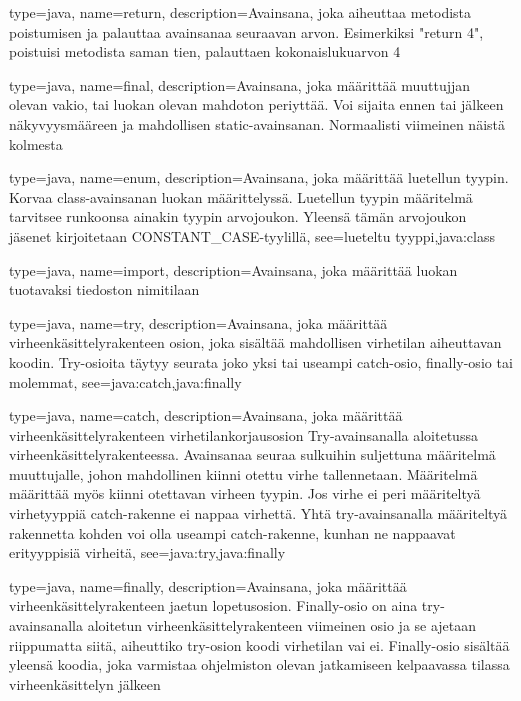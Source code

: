 {
	type=java,
	name=return,
	description={Avainsana, joka aiheuttaa metodista poistumisen ja palauttaa avainsanaa seuraavan
arvon. Esimerkiksi "return 4", poistuisi metodista saman tien, palauttaen kokonaislukuarvon 4}
}

{
	type=java,
	name=final,
	description={Avainsana, joka määrittää muuttujjan olevan vakio, tai luokan olevan mahdoton
periyttää. Voi sijaita ennen tai jälkeen näkyvyysmääreen ja mahdollisen static-avainsanan.
Normaalisti viimeinen näistä kolmesta}
}

{
	type=java,
	name=enum,
	description={Avainsana, joka määrittää luetellun tyypin. Korvaa class-avainsanan luokan
määrittelyssä. Luetellun tyypin määritelmä tarvitsee runkoonsa ainakin tyypin arvojoukon. Yleensä
tämän arvojoukon jäsenet kirjoitetaan CONSTANT\_CASE-tyylillä},
	see={lueteltu tyyppi,java:class}
}

{
	type=java,
	name=import,
	description={Avainsana, joka määrittää luokan tuotavaksi tiedoston nimitilaan}
}

{
	type=java,
	name=try,
	description={Avainsana, joka määrittää virheenkäsittelyrakenteen osion, joka sisältää
mahdollisen virhetilan aiheuttavan koodin. Try-osioita täytyy seurata joko yksi tai useampi 
catch-osio, finally-osio tai molemmat},
	see={java:catch,java:finally}
}

{
	type=java,
	name=catch,
	description={Avainsana, joka määrittää virheenkäsittelyrakenteen virhetilankorjausosion
Try-avainsanalla aloitetussa virheenkäsittelyrakenteessa. Avainsanaa seuraa sulkuihin suljettuna
määritelmä muuttujalle, johon mahdollinen kiinni otettu virhe tallennetaan. Määritelmä määrittää
myös kiinni otettavan virheen tyypin. Jos virhe ei peri määriteltyä virhetyyppiä catch-rakenne ei
nappaa virhettä. Yhtä try-avainsanalla määriteltyä rakennetta kohden voi olla useampi
catch-rakenne, kunhan ne nappaavat erityyppisiä virheitä},
	see={java:try,java:finally}
}

{
	type=java,
	name=finally,
	description={Avainsana, joka määrittää virheenkäsittelyrakenteen jaetun lopetusosion.
Finally-osio on aina try-avainsanalla aloitetun virheenkäsittelyrakenteen viimeinen osio ja se
ajetaan riippumatta siitä, aiheuttiko try-osion koodi virhetilan vai ei. Finally-osio sisältää
yleensä koodia, joka varmistaa ohjelmiston olevan jatkamiseen kelpaavassa tilassa
virheenkäsittelyn jälkeen}
}

